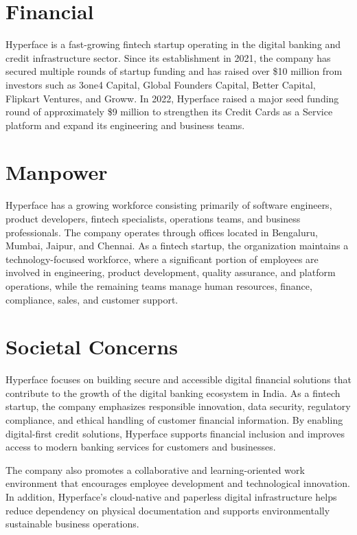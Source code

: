 \section{Financial}
Hyperface is a fast-growing fintech startup operating in the digital banking and credit infrastructure sector. Since its establishment in 2021, the company has secured multiple rounds of startup funding and has raised over \$10 million from investors such as 3one4 Capital, Global Founders Capital, Better Capital, Flipkart Ventures, and Groww. In 2022, Hyperface raised a major seed funding round of approximately \$9 million to strengthen its Credit Cards as a Service platform and expand its engineering and business teams.

\section{Manpower}
Hyperface has a growing workforce consisting primarily of software engineers, product developers, fintech specialists, operations teams, and business professionals. The company operates through offices located in Bengaluru, Mumbai, Jaipur, and Chennai. As a fintech startup, the organization maintains a technology-focused workforce, where a significant portion of employees are involved in engineering, product development, quality assurance, and platform operations, while the remaining teams manage human resources, finance, compliance, sales, and customer support.

\section{Societal Concerns}
Hyperface focuses on building secure and accessible digital financial solutions that contribute to the growth of the digital banking ecosystem in India. As a fintech startup, the company emphasizes responsible innovation, data security, regulatory compliance, and ethical handling of customer financial information. By enabling digital-first credit solutions, Hyperface supports financial inclusion and improves access to modern banking services for customers and businesses.

The company also promotes a collaborative and learning-oriented work environment that encourages employee development and technological innovation. In addition, Hyperface's cloud-native and paperless digital infrastructure helps reduce dependency on physical documentation and supports environmentally sustainable business operations.

